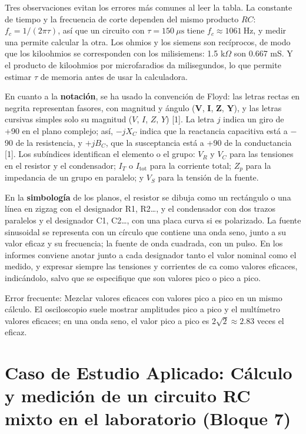 \documentclass[11pt,letterpaper]{article}
\begin{document}
Tres observaciones evitan los errores más comunes al leer la tabla. La constante de tiempo y la frecuencia de corte dependen del mismo producto $RC$: $f_c = 1/(2\pi\tau)$, así que un circuito con $\tau = 150\ \mu\text{s}$ tiene $f_c \approx 1061\ \text{Hz}$, y medir una permite calcular la otra. Los ohmios y los siemens son recíprocos, de modo que los kiloohmios se corresponden con los milisiemens: 1.5 k\ensuremath{\Omega} son 0.667 mS. Y el producto de kiloohmios por microfaradios da milisegundos, lo que permite estimar $\tau$ de memoria antes de usar la calculadora.

En cuanto a la \textbf{notación}, se ha usado la convención de Floyd: las letras rectas en negrita representan fasores, con magnitud y ángulo ($\mathbf{V}$, $\mathbf{I}$, $\mathbf{Z}$, $\mathbf{Y}$), y las letras cursivas simples solo su magnitud ($V$, $I$, $Z$, $Y$) [1]. La letra $j$ indica un giro de +90\textdegree{} en el plano complejo; así, $-jX_C$ indica que la reactancia capacitiva está a \ensuremath{-}90\textdegree{} de la resistencia, y $+jB_C$, que la susceptancia está a +90\textdegree{} de la conductancia [1]. Los subíndices identifican el elemento o el grupo: $V_R$ y $V_C$ para las tensiones en el resistor y el condensador; $I_T$ o $I_{\mathrm{tot}}$ para la corriente total; $Z_p$ para la impedancia de un grupo en paralelo; y $V_S$ para la tensión de la fuente.

En la \textbf{simbología} de los planos, el resistor se dibuja como un rectángulo o una línea en zigzag con el designador R1, R2\ldots{}, y el condensador con dos trazos paralelos y el designador C1, C2\ldots{}, con una placa curva si es polarizado. La fuente sinusoidal se representa con un círculo que contiene una onda seno, junto a su valor eficaz y su frecuencia; la fuente de onda cuadrada, con un pulso. En los informes conviene anotar junto a cada designador tanto el valor nominal como el medido, y expresar siempre las tensiones y corrientes de ca como valores eficaces, indicándolo, salvo que se especifique que son valores pico o pico a pico.

\begin{nota}{Error frecuente:}
Mezclar valores eficaces con valores pico a pico en un mismo cálculo. El osciloscopio suele mostrar amplitudes pico a pico y el multímetro valores eficaces; en una onda seno, el valor pico a pico es $2\sqrt{2} \approx 2.83$ veces el eficaz.
\end{nota}

\section{Caso de Estudio Aplicado: Cálculo y medición de un circuito RC mixto en el laboratorio (Bloque 7)}
\end{document}

